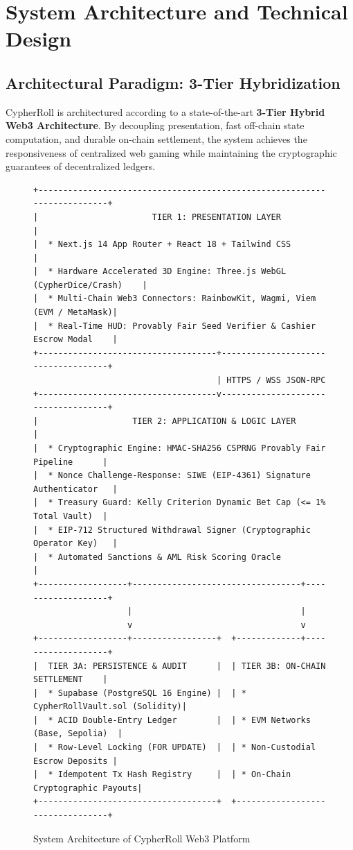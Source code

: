 \section{System Architecture and Technical Design}

\subsection{Architectural Paradigm: 3-Tier Hybridization}
CypherRoll is architectured according to a state-of-the-art \textbf{3-Tier Hybrid Web3 Architecture}. By decoupling presentation, fast off-chain state computation, and durable on-chain settlement, the system achieves the responsiveness of centralized web gaming while maintaining the cryptographic guarantees of decentralized ledgers.

\begin{figure}[h!]
\centering
\begin{tcolorbox}[colback=gray!5,colframe=blue!70!black,title=\textbf{Figure 2.1: CypherRoll 3-Tier Architecture High-Level Design}]
\small
\begin{verbatim}
+-------------------------------------------------------------------------+
|                       TIER 1: PRESENTATION LAYER                        |
|  * Next.js 14 App Router + React 18 + Tailwind CSS                      |
|  * Hardware Accelerated 3D Engine: Three.js WebGL (CypherDice/Crash)    |
|  * Multi-Chain Web3 Connectors: RainbowKit, Wagmi, Viem (EVM / MetaMask)|
|  * Real-Time HUD: Provably Fair Seed Verifier & Cashier Escrow Modal    |
+------------------------------------+------------------------------------+
                                     | HTTPS / WSS JSON-RPC
+------------------------------------v------------------------------------+
|                   TIER 2: APPLICATION & LOGIC LAYER                     |
|  * Cryptographic Engine: HMAC-SHA256 CSPRNG Provably Fair Pipeline      |
|  * Nonce Challenge-Response: SIWE (EIP-4361) Signature Authenticator   |
|  * Treasury Guard: Kelly Criterion Dynamic Bet Cap (<= 1% Total Vault)  |
|  * EIP-712 Structured Withdrawal Signer (Cryptographic Operator Key)   |
|  * Automated Sanctions & AML Risk Scoring Oracle                        |
+------------------+----------------------------------+-------------------+
                   |                                  |
                   v                                  v
+------------------+-----------------+  +-------------+-------------------+
|  TIER 3A: PERSISTENCE & AUDIT      |  | TIER 3B: ON-CHAIN SETTLEMENT    |
|  * Supabase (PostgreSQL 16 Engine) |  | * CypherRollVault.sol (Solidity)|
|  * ACID Double-Entry Ledger        |  | * EVM Networks (Base, Sepolia)  |
|  * Row-Level Locking (FOR UPDATE)  |  | * Non-Custodial Escrow Deposits |
|  * Idempotent Tx Hash Registry     |  | * On-Chain Cryptographic Payouts|
+------------------------------------+  +---------------------------------+
\end{verbatim}
\end{tcolorbox}
\caption{System Architecture of CypherRoll Web3 Platform}
\end{figure}

